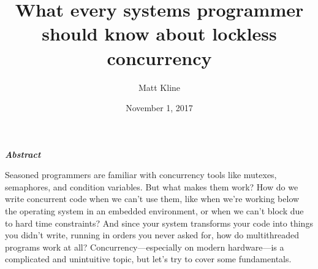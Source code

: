 \documentclass[fontsize=10pt, numbers=endperiod]{scrartcl}
\title{What every systems programmer should know about lockless concurrency}
\author{Matt Kline}
\date{November 1, 2017}
\makeatletter
\let\runauthor\@author
\let\rundate\@date
\let\runtitle\@title
\makeatother
\begin{document}
\begin{center}
\sffamily\Large \textbf{\runtitle}
\bigskip

\normalsize
\runauthor
\smallskip

\rundate
\end{center}
\bigskip

\begin{center}\begin{minipage}{0.7\linewidth}
\begin{center}
\large \bfseries\itshape Abstract
\end{center}

Seasoned programmers are familiar with concurrency
tools like mutexes, semaphores, and condition variables.
But what makes them work?
How do we write concurrent code when we can't use them,
like when we're working below the operating system in an embedded environment,
or when we can't block due to hard time constraints?
And since your system transforms your code into things you didn't write,
running in orders you never asked for, how do multithreaded programs work at all?
Concurrency---especially on modern hardware---is a complicated and unintuitive
topic, but let's try to cover some fundamentals.
\bigskip

\tableofcontents
\end{minipage}\end{center}
\medskip
\end{document}
